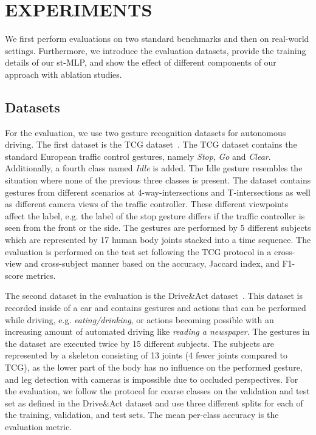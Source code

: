 \documentclass[letterpaper, 10 pt, conference]{ieeeconf}
\begin{document}
\section{EXPERIMENTS}
\label{sec:experiments}
We first perform evaluations on two standard benchmarks and then on real-world settings. Furthermore, we introduce the evaluation datasets, provide the training details of our st-MLP, and show the effect of different components of our approach with ablation studies. 

\subsection{Datasets}
\label{subsec:datasets}
For the evaluation, we use two gesture recognition datasets for autonomous driving. The first dataset is the TCG dataset~\cite{wiederer2020traffic}. The TCG dataset contains the standard European traffic control gestures, namely \textit{Stop}, \textit{Go} and \textit{Clear}. Additionally, a fourth class named \textit{Idle} is added. The Idle gesture resembles the situation where none of the previous three classes is present. The dataset contains gestures from different scenarios at 4-way-intersections and T-intersections as well as different camera views of the traffic controller. These different viewpoints affect the label, e.g. the label of the stop gesture differs if the traffic controller is seen from the front or the side. The gestures are performed by 5 different subjects which are represented by 17 human body joints stacked into a time sequence. The evaluation is performed on the test set following the TCG protocol in a cross-view and cross-subject manner based on the accuracy, Jaccard index, and F1-score metrics.

The second dataset in the evaluation is the Drive\&Act dataset~\cite{drive_and_act_2019_iccv}. This dataset is recorded inside of a car and contains gestures and actions that can be performed while driving, e.g. \textit{eating/drinking}, or actions becoming possible with an increasing amount of automated driving like \textit{reading a newspaper}. The gestures in the dataset are executed twice by 15 different subjects. The subjects are represented by a skeleton consisting of 13 joints (4 fewer joints compared to TCG), as the lower part of the body has no influence on the performed gesture, and leg detection with cameras is impossible due to occluded perspectives. For the evaluation, we follow the protocol for coarse classes on the validation and test set as defined in the Drive\&Act dataset and use three different splits for each of the training, validation, and test sets. The mean per-class accuracy is the evaluation metric. 
\end{document}
